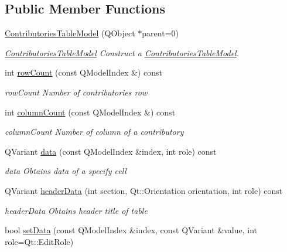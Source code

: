 \subsection*{Public Member Functions}
\begin{DoxyCompactItemize}
\item 
\hyperlink{classContributoriesTableModel_a7fb98c9bddccafe26319fc75ee92c80b}{Contributories\+Table\+Model} (Q\+Object $\ast$parent=0)
\begin{DoxyCompactList}\small\item\em \hyperlink{classContributoriesTableModel}{Contributories\+Table\+Model} Construct a \hyperlink{classContributoriesTableModel}{Contributories\+Table\+Model}. \end{DoxyCompactList}\item 
int \hyperlink{classContributoriesTableModel_abab4002f904986345347dd43aa815380}{row\+Count} (const Q\+Model\+Index \&) const 
\begin{DoxyCompactList}\small\item\em row\+Count Number of contributories row \end{DoxyCompactList}\item 
int \hyperlink{classContributoriesTableModel_ae4734e8d3be16e8be792fe6eacee8095}{column\+Count} (const Q\+Model\+Index \&) const 
\begin{DoxyCompactList}\small\item\em column\+Count Number of column of a contributory \end{DoxyCompactList}\item 
Q\+Variant \hyperlink{classContributoriesTableModel_a6be653469563e4a78ce5934963f9c602}{data} (const Q\+Model\+Index \&index, int role) const 
\begin{DoxyCompactList}\small\item\em data Obtains data of a specify cell \end{DoxyCompactList}\item 
Q\+Variant \hyperlink{classContributoriesTableModel_a6500cff8e7312227347b971bd47e1190}{header\+Data} (int section, Qt\+::\+Orientation orientation, int role) const 
\begin{DoxyCompactList}\small\item\em header\+Data Obtains header title of table \end{DoxyCompactList}\item 
bool \hyperlink{classContributoriesTableModel_aabe9da4a6f1e5027879ed7132aa03d01}{set\+Data} (const Q\+Model\+Index \&index, const Q\+Variant \&value, int role=Qt\+::\+Edit\+Role)

\end{DoxyCompactItemize}
